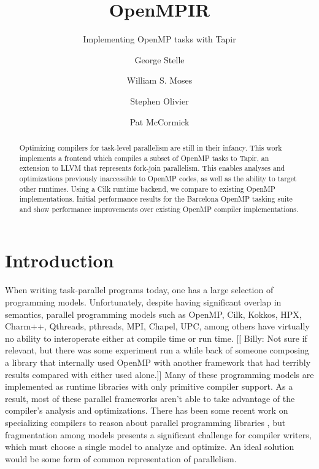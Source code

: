 \documentclass[sigconf]{acmart}
\newcommand{\wmnote}[1]{{\scriptsize \color{red} [[ Billy: #1]]}}
\begin{document}

\title{OpenMPIR}
\subtitle{Implementing OpenMP tasks with Tapir}
\author{George Stelle}

\author{William S. Moses}

\author{Stephen Olivier}

\author{Pat McCormick}

\begin{abstract}
Optimizing compilers for task-level parallelism are still in their infancy.
This work implements a frontend which compiles a subset of OpenMP tasks to
Tapir, an extension to LLVM that represents fork-join parallelism. This enables
analyses and optimizations previously inaccessible to OpenMP codes, as well as
the ability to target other runtimes. Using a Cilk runtime backend, we compare
to existing OpenMP implementations. Initial performance results for the
Barcelona OpenMP tasking suite and show performance improvements over existing
OpenMP compiler implementations. 
\end{abstract}

\maketitle

\section{Introduction} \label{Sec:Introduction}
 
When writing task-parallel programs today, one has a large selection of
programming models. Unfortunately, despite having significant overlap in
semantics, parallel programming models such as OpenMP\cite{}, Cilk\cite{},
Kokkos\cite{}, HPX\cite{}, Charm++\cite{},
Qthreads\cite{}, pthreads\cite{}, MPI\cite{}, Chapel\cite{}, UPC\cite{},
among others have virtually no ability to interoperate either at compile
time or run time.
\wmnote{Not sure if relevant, but there was some experiment run a while back of someone composing a library that internally used OpenMP
with another framework that had terribly results compared with either used alone.}
Many of these programming models are implemented as runtime libraries with only
primitive compiler support. As a result, most of these parallel frameworks
aren't able to take advantage of the compiler's analysis and optimizations.
There has been some recent work on specializing compilers to reason
about parallel programming libraries \cite{Moss_2016}, but fragmentation among
models presents a significant challenge for compiler writers, which must choose
a single model to analyze and optimize. An ideal solution would be some form of
common representation of parallelism.
\end{document}
